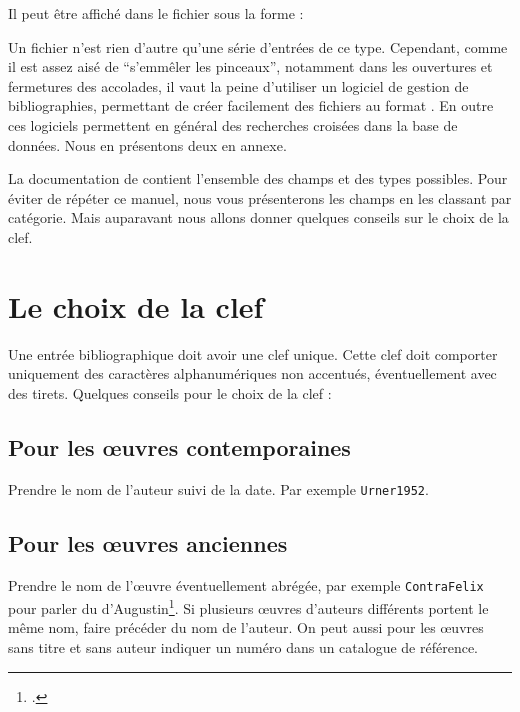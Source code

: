 Il peut être affiché dans le fichier  sous la forme :

\begin{quotation}
\cite{Urner1952}
\end{quotation}



Un fichier  n'est rien d'autre qu'une série d'entrées de ce type. Cependant, comme il est assez aisé de \enquote{s'emmêler les pinceaux}, notamment dans les ouvertures et fermetures des accolades, il vaut la peine d'utiliser un logiciel de gestion de bibliographies, permettant de créer facilement des fichiers au format . En outre ces logiciels permettent en général des recherches croisées dans la base de données. Nous en  présentons deux en annexe.

La documentation de  contient l'ensemble des champs et des types possibles. Pour éviter de répéter ce manuel, nous vous présenterons les champs en les classant par catégorie. Mais auparavant nous allons donner quelques conseils sur le choix de la clef.

\section{Le choix de la clef}

Une entrée bibliographique doit avoir une clef unique. Cette clef doit comporter uniquement des caractères alphanumériques non accentués, éventuellement avec des tirets. 
Quelques conseils pour le choix de la clef :
\subsection{Pour les œuvres contemporaines}
Prendre le nom de l'auteur suivi de la date. Par exemple \verb|Urner1952|.

\subsection{Pour les œuvres anciennes}

Prendre le nom de l'œuvre  éventuellement abrégée, par exemple \verb|ContraFelix| pour parler du  d'Augustin\footcite{ContraFelix}. Si plusieurs œuvres d'auteurs différents portent le même nom, faire précéder du nom de l'auteur. On peut aussi pour les œuvres sans titre et sans auteur indiquer un numéro dans un catalogue de référence.



